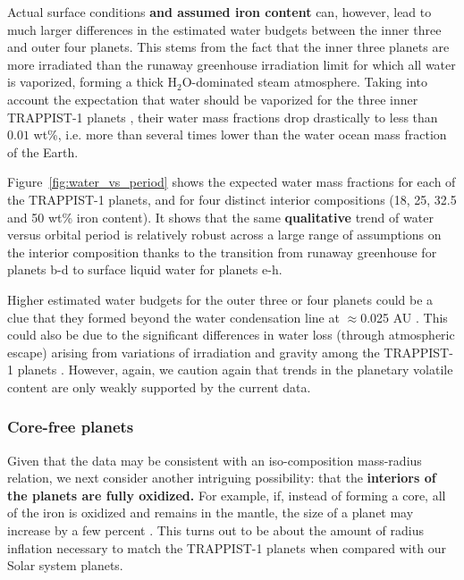 \documentclass[twocolumn]{aastex63}
\begin{document}
Actual surface conditions \textbf{and assumed iron content} can, however, lead to much larger differences in the estimated water budgets between the inner three and outer four planets. This stems from the fact that the inner three planets are more irradiated than the runaway greenhouse irradiation limit \citep{Kopparapu2013,Wolf2017,Turbet2018} for which all water is vaporized, forming a thick H$_2$O-dominated steam atmosphere. Taking into account the expectation that water should be vaporized for the three inner TRAPPIST-1 planets \citep{Turbet2019,Turbet2020}, their water mass fractions drop drastically to less than $0.01$ wt\%, i.e. more than several times lower than the water ocean mass fraction of the Earth.

Figure~\ref{fig:water_vs_period} shows the expected water mass fractions for each of the TRAPPIST-1 planets, and for four distinct interior compositions (18, 25, 32.5 and 50 wt\% iron content). It shows that the same \textbf{qualitative} trend of water versus orbital period is relatively robust across a large range of assumptions on the interior composition thanks to the transition from runaway greenhouse for planets b-d to surface liquid water for planets e-h.  %

Higher estimated water budgets for the outer three or four planets could be a clue that they formed beyond the water condensation line at $\approx$0.025 AU \citep{Unterborn2018a}. This could also be due to the significant differences in water loss (through atmospheric escape) arising from variations of irradiation and gravity among the TRAPPIST-1 planets \citep{Lissauer2007, Bolmont2017,Bourrier2017}.  However, again, we caution again that trends in the planetary volatile content are only weakly supported by the current data.

\subsubsection{Core-free planets} \label{sec:core_free}

Given that the data may be consistent with an iso-composition mass-radius relation, we next consider another intriguing possibility:
that the \textbf{interiors of the planets are fully oxidized.} For example, if, instead of forming a core, all of the iron is oxidized and remains in the mantle, the size of a planet may increase by a few percent \citep{ElkinsTanton2008}.  This turns out to be about the amount of radius inflation necessary to match the TRAPPIST-1 planets when compared with our Solar system planets.
\end{document}
